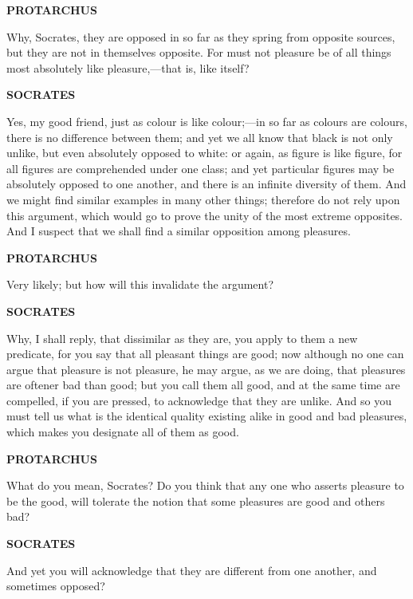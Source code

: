 \documentclass[11pt,letter]{article}
\begin{document}
\par \textbf{PROTARCHUS}
\par   Why, Socrates, they are opposed in so far as they spring from opposite sources, but they are not in themselves opposite. For must not pleasure be of all things most absolutely like pleasure,—that is, like itself?

\par \textbf{SOCRATES}
\par   Yes, my good friend, just as colour is like colour;—in so far as colours are colours, there is no difference between them; and yet we all know that black is not only unlike, but even absolutely opposed to white:  or again, as figure is like figure, for all figures are comprehended under one class; and yet particular figures may be absolutely opposed to one another, and there is an infinite diversity of them. And we might find similar examples in many other things; therefore do not rely upon this argument, which would go to prove the unity of the most extreme opposites. And I suspect that we shall find a similar opposition among pleasures.

\par \textbf{PROTARCHUS}
\par   Very likely; but how will this invalidate the argument?

\par \textbf{SOCRATES}
\par   Why, I shall reply, that dissimilar as they are, you apply to them a new predicate, for you say that all pleasant things are good; now although no one can argue that pleasure is not pleasure, he may argue, as we are doing, that pleasures are oftener bad than good; but you call them all good, and at the same time are compelled, if you are pressed, to acknowledge that they are unlike. And so you must tell us what is the identical quality existing alike in good and bad pleasures, which makes you designate all of them as good.

\par \textbf{PROTARCHUS}
\par   What do you mean, Socrates? Do you think that any one who asserts pleasure to be the good, will tolerate the notion that some pleasures are good and others bad?

\par \textbf{SOCRATES}
\par   And yet you will acknowledge that they are different from one another, and sometimes opposed?
\end{document}
